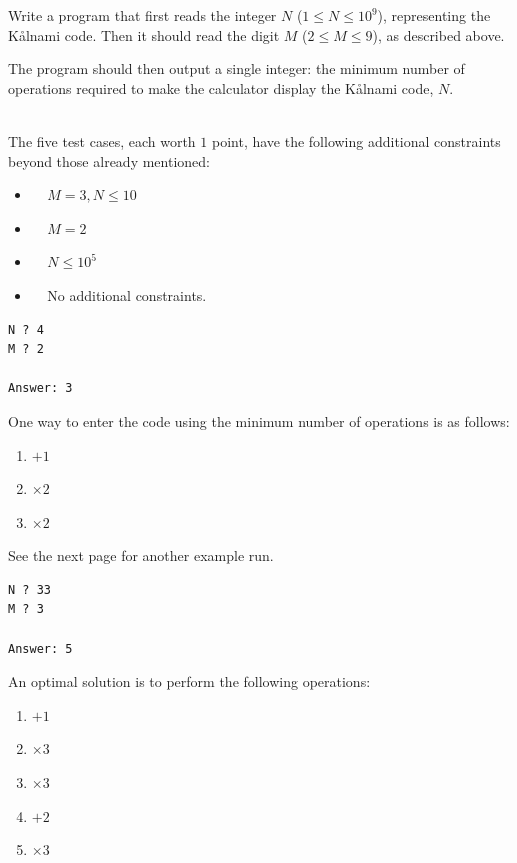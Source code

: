 Write a program that first reads the integer $N$ ($1 \leq N \leq 10^9$), representing the Kålnami code.  
Then it should read the digit $M$ ($2 \leq M \leq 9$), as described above.  

The program should then output a single integer: the minimum number of operations required to make the calculator display the Kålnami code, $N$.  

\\  
The five test cases, each worth $1$ point, have the following additional constraints beyond those already mentioned:  
\begin{itemize}
    \item[(1)] $\;\;\;\;M=3, N \leq 10$ 
    \item[(2)] $\;\;\;\;M=2$ 
    \item[(3)] $\;\;\;\;N \leq 10^5$
    \item[(4-5)] $\;\;\;\; $No additional constraints.
\end{itemize}  

\begin{verbatim}
N ? 4
M ? 2

Answer: 3
\end{verbatim}  

One way to enter the code using the minimum number of operations is as follows:  
\begin{enumerate}
  \item $+1$
  \item $\times 2$
  \item $\times 2$
\end{enumerate}  

See the next page for another example run.  

\newpage  

\begin{verbatim}
N ? 33
M ? 3

Answer: 5
\end{verbatim}  

An optimal solution is to perform the following operations:  
\begin{enumerate}
  \item $+1$
  \item $\times 3$
  \item $\times 3$
  \item $+2$
  \item $\times 3$
\end{enumerate}  



